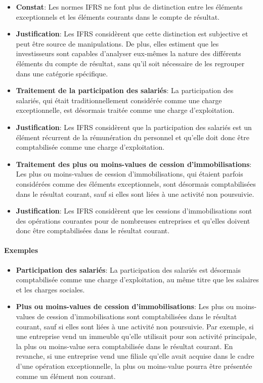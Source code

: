 \documentclass[a4paper, 12pt]{report}
\begin{document}
\begin{itemize}
	\item \textbf{Constat}: Les normes IFRS ne font plus de distinction entre les éléments exceptionnels et les éléments courants dans le compte de résultat.
	\item \textbf{Justification}: Les IFRS considèrent que cette distinction est subjective et peut être source de manipulations. De plus, elles estiment que les investisseurs sont capables d'analyser eux-mêmes la nature des différents éléments du compte de résultat, sans qu'il soit nécessaire de les regrouper dans une catégorie spécifique.
	\item \textbf{Traitement de la participation des salariés}: La participation des salariés, qui était traditionnellement considérée comme une charge exceptionnelle, est désormais traitée comme une charge d'exploitation.
	\item \textbf{Justification}: Les IFRS considèrent que la participation des salariés est un élément récurrent de la rémunération du personnel et qu'elle doit donc être comptabilisée comme une charge d'exploitation.
	\item \textbf{Traitement des plus ou moins-values de cession d'immobilisations}: Les plus ou moins-values de cession d'immobilisations, qui étaient parfois considérées comme des éléments exceptionnels, sont désormais comptabilisées dans le résultat courant, sauf si elles sont liées à une activité non poursuivie.
	\item \textbf{Justification}: Les IFRS considèrent que les cessions d'immobilisations sont des opérations courantes pour de nombreuses entreprises et qu'elles doivent donc être comptabilisées dans le résultat courant.
\end{itemize}

\paragraph{Exemples}

\begin{itemize}
	\item \textbf{Participation des salariés}: La participation des salariés est désormais comptabilisée comme une charge d'exploitation, au même titre que les salaires et les charges sociales.
	\item \textbf{Plus ou moins-values de cession d'immobilisations}: Les plus ou moins-values de cession d'immobilisations sont comptabilisées dans le résultat courant, sauf si elles sont liées à une activité non poursuivie. Par exemple, si une entreprise vend un immeuble qu'elle utilisait pour son activité principale, la plus ou moins-value sera comptabilisée dans le résultat courant. En revanche, si une entreprise vend une filiale qu'elle avait acquise dans le cadre d'une opération exceptionnelle, la plus ou moins-value pourra être présentée comme un élément non courant.
\end{itemize}
\end{document}
